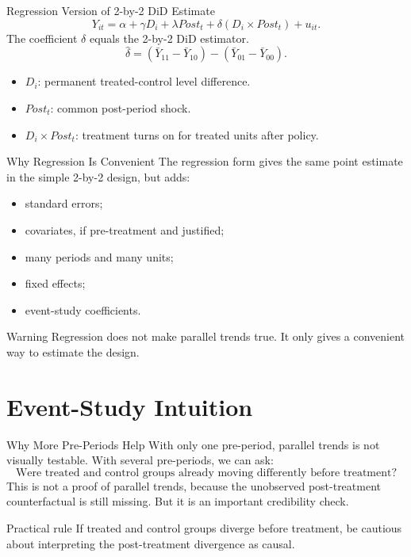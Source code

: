 \documentclass[11pt,aspectratio=169]{beamer}
\newcommand{\derivbutton}[1]{\vspace{0.4em}\hfill\hyperlink{app:#1}{\beamerbutton{Appendix details}}}
\begin{document}
\begin{frame}{Regression Version of 2-by-2 DiD}
  \hypertarget{main:did-reg}{}
  Estimate
  \[
    Y_{it}
    =
    \alpha
    +
    \gamma D_i
    +
    \lambda Post_t
    +
    \delta (D_i\times Post_t)
    +
    u_{it}.
  \]
  \vspace{0.3em}
  The coefficient \(\delta\) equals the 2-by-2 DiD estimator.
  \[
    \hat\delta
    =
    (\bar Y_{11}-\bar Y_{10})
    -
    (\bar Y_{01}-\bar Y_{00}).
  \]
  \begin{itemize}
    \item \(D_i\): permanent treated-control level difference.
    \item \(Post_t\): common post-period shock.
    \item \(D_i\times Post_t\): treatment turns on for treated units after policy.
  \end{itemize}
  \derivbutton{did-regression}
\end{frame}

\begin{frame}{Why Regression Is Convenient}
  The regression form gives the same point estimate in the simple 2-by-2 design, but adds:
  \begin{itemize}
    \item standard errors;
    \item covariates, if pre-treatment and justified;
    \item many periods and many units;
    \item fixed effects;
    \item event-study coefficients.
  \end{itemize}
  \begin{block}{Warning}
    Regression does not make parallel trends true. It only gives a convenient way to estimate the design.
  \end{block}
\end{frame}

\section{Event-Study Intuition}

\begin{frame}{Why More Pre-Periods Help}
  With only one pre-period, parallel trends is not visually testable.
  With several pre-periods, we can ask:
  \[
    \text{Were treated and control groups already moving differently before treatment?}
  \]
  \vspace{0.3em}
  This is not a proof of parallel trends, because the unobserved post-treatment counterfactual is still missing.
  \vspace{0.3em}
  But it is an important credibility check.
  \begin{block}{Practical rule}
    If treated and control groups diverge before treatment, be cautious about interpreting the post-treatment divergence as causal.
  \end{block}
\end{frame}
\end{document}
